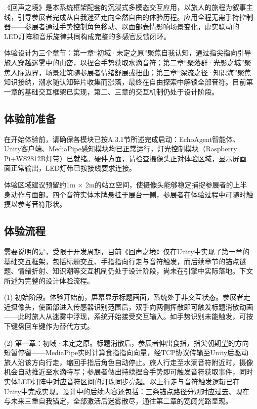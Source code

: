 \documentclass[bachelor]{njupthesis}
\begin{document}
《回声之境》是本系统框架配套的沉浸式多模态交互应用，以旅人的旅程为叙事主线，引导参展者完成从自我迷茫走向全然自由的体验历程。应用全程无需手持控制器——参展者通过手势控制角色移动、以面部表情影响场景变化，虚实联动的LED灯阵和音乐旋律共同构成完整的多感官反馈闭环。

体验设计为三个章节：第一章“初域·未定之原”聚焦自我认知，通过指尖指向引导旅人穿越迷雾中的山峦，以捏合手势获取水滴音符；第二章“聚落群·光影之城”聚焦人际边界，场景建筑随参展者情绪舒展或扭曲；第三章“深流之径·知识海”聚焦知识接纳，潮水随认知碎片收集而涨落，最终在自由探索中解锁全部音符。目前第一章的基础交互框架已实现，第二、三章的交互机制仍处于设计阶段。

\subsection{体验前准备}

在开始体验前，请确保各模块已按A.3.1节所述完成启动：EchoAgent智能体、Unity客户端、MediaPipe感知模块均已正常运行，灯光控制模块（Raspberry Pi+WS2812B灯带）已就绪。硬件方面，请检查摄像头正对体验区域，显示屏画面正常输出，LED灯带已按接线要求连接。

体验区域建议预留约1m $\times$ 2m的站立空间，使摄像头能够稳定捕捉参展者的上半身动作与面部。四个音符实体木牌悬挂于展台一侧，参展者在体验过程中可随时触摸以参考音符形状。

\subsection{体验流程}

需要说明的是，受限于开发周期，目前《回声之境》仅在Unity中实现了第一章的基础交互框架，包括标题交互、手指指向行走与音符触发，而后续章节的锚点谜题、情绪折射、知识潮等交互机制仍处于设计阶段，尚未在引擎中实际落地。下文所述为完整的设计体验流程。

(1) 初始阶段。体验开始前，屏幕显示标题画面，系统处于非交互状态。参展者走近摄像头，使面部进入传感器识别范围后，双手向两侧挥散即可触发标题消散动画——此时旅人从迷雾中浮现，系统开始接受交互输入。如手势识别未能触发，可按下键盘回车键作为替代方式。

(2) 第一章：初域·未定之原。标题消散后，参展者伸出食指，指尖朝期望的方向短暂停留——MediaPipe实时计算食指指向向量，经TCP协议传输至Unity后驱动旅人沿该方向行走，缩回手指后角色自动停止。旅人行走至水滴音符附近时，摄像机会自动推近至水滴特写；参展者做出持续捏合手势即可触发音符获取事件，同时实体LED灯阵中对应音符区间的灯珠同步亮起。以上行走与音符触发逻辑已在Unity中完成实现。设计中的后续内容还包括：三条锚点路径分别对应过去、现在与未来三重自我锚定，全部激活后迷雾散尽，通往第二章的宽阔光路显现。
\end{document}
